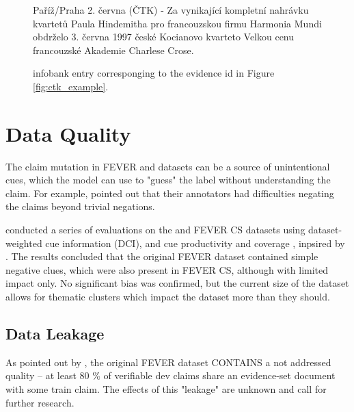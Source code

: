 \begin{figure}[h!]
    \begin{framed}
        Paříž/Praha 2. června (ČTK) - Za vynikající kompletní nahrávku kvartetů Paula Hindemitha pro francouzskou firmu Harmonia Mundi obdrželo 3. června 1997 české Kocianovo kvarteto Velkou cenu francouzské Akademie Charlese Crose.
    \end{framed}
    \caption{\CTK{} infobank entry corresponging to the evidence id in Figure \ref{fig:ctk_example}.}
\end{figure}

\section{Data Quality}

The claim mutation in FEVER and \CTK{} datasets can be a source of unintentional cues, which the model can use to "guess" the label without understanding the claim.
For example, \citet{fever} pointed out that their annotators had difficulties negating the claims beyond trivial negations.

\citet{rypar} conducted a series of evaluations on the \CTK{} and FEVER CS datasets using dataset-weighted cue information (DCI), and cue productivity and coverage \citep{niven-probing}, inpsired by \citet{derczynski-etal-2020-maintaining}. 
The results concluded that the original FEVER dataset contained simple negative clues, which were also present in FEVER CS, although with limited impact only. No significant bias was confirmed, but the current size of the \CTK{} dataset allows for thematic clusters which impact the dataset more than they should. 

\subsection{Data Leakage}

As pointed out by \citet{ullrich}, the original FEVER dataset CONTAINS a not addressed quality -- at least 80 \% of verifiable dev claims share an evidence-set document with some train claim. The effects of this "leakage" are unknown and call for further research.